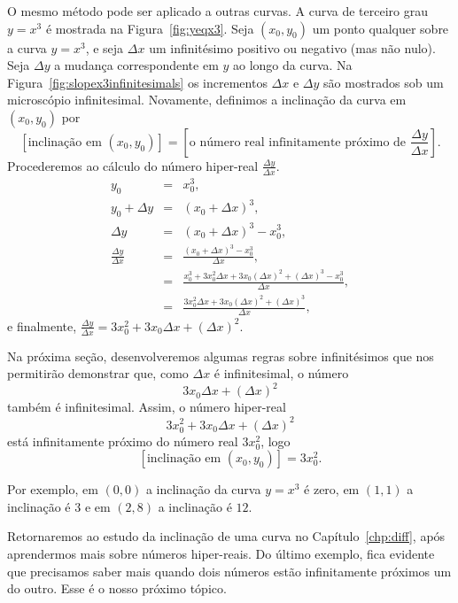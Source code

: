 \documentclass{svmono}
\begin{document}
O mesmo método pode ser aplicado a outras curvas. A curva de
terceiro grau $y = x^3$ é mostrada na Figura~\ref{fig:yeqx3}.
Seja $(x_0,y_0)$ um ponto qualquer sobre a curva $y = x^3$,
e seja $\Delta x$ um infinitésimo positivo ou negativo (mas
não nulo). Seja $\Delta y$ a mudança correspondente em $y$ ao
longo da curva. Na Figura~\ref{fig:slopex3infinitesimals} os
incrementos $\Delta x$ e $\Delta y$ são mostrados sob um
microscópio infinitesimal. Novamente, definimos a inclinação da
curva em $(x_0,y_0)$ por
\[
  [\text{inclinação em } (x_0,y_0)] =
  \left[ \text{o número real infinitamente próximo de } \frac{\Delta y}{\Delta x} \right].
\]
Procederemos ao cálculo do número hiper-real
$\displaystyle \frac{\Delta y}{\Delta x}.$
\begin{eqnarray*}
             y_0 & = & x_0^3, \\
  y_0 + \Delta y & = & (x_0 + \Delta x)^3, \\
        \Delta y & = & (x_0 + \Delta x)^3 - x_0^3, \\
  \frac{\Delta y}{\Delta x}
                 & = & \frac{(x_0 + \Delta x)^3 - x_0^3}
                            {\Delta x}, \\
                 & = & \frac{x_0^3 + 3 x_0^2 \Delta x + 3x_0(\Delta x)^2
                             + (\Delta x)^3 - x_0^3}
                            {\Delta x}, \\
                 & = & \frac{3 x_0^2 \Delta x + 3x_0(\Delta x)^2
                             + (\Delta x)^3}
                            {\Delta x},
\end{eqnarray*}
e finalmente, \SPC $\displaystyle \frac{\Delta y}{\Delta x} =
3x_0^2 + 3x_0 \Delta x + (\Delta x)^2.$

Na próxima seção, desenvolveremos algumas regras sobre
infinitésimos que nos permitirão demonstrar que, como
$\Delta x$ é infinitesimal, o número
\[
  3x_0\Delta x + (\Delta x)^2
\]
também é infinitesimal. Assim, o número hiper-real
\[
  3 x_0^2 + 3 x_0 \Delta x + (\Delta x)^2
\]
está infinitamente próximo do número real $3x_0^2$, logo
\[
  [\text{inclinação em } (x_0,y_0)] = 3 x_0^2.
\]

Por exemplo, em $(0,0)$ a inclinação da curva $y = x^3$ é
zero, em $(1,1)$ a inclinação é $3$ e em $(2,8)$ a inclinação
é $12$.

Retornaremos ao estudo da inclinação de uma curva no
Capítulo~\ref{chp:diff}, após aprendermos mais sobre
números hiper-reais. Do último exemplo, fica evidente que
precisamos saber mais quando dois números estão infinitamente
próximos um do outro. Esse é o nosso próximo tópico.
\end{document}
